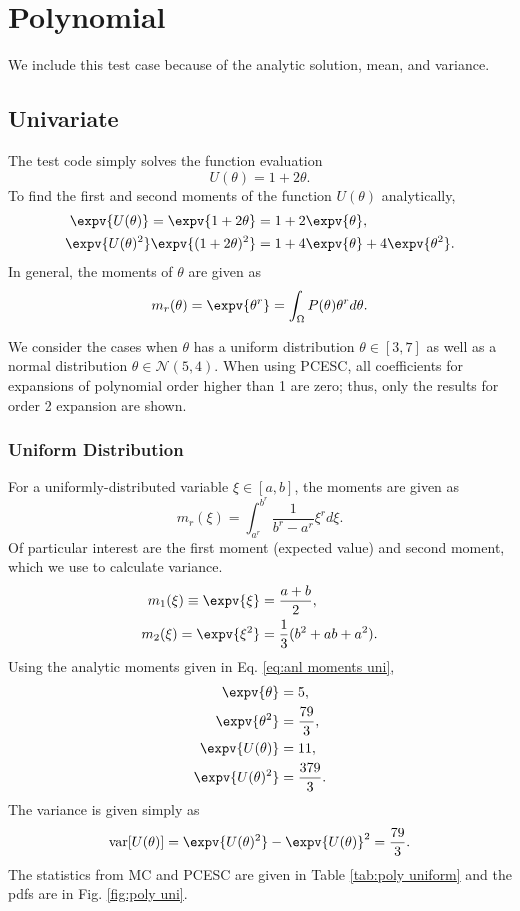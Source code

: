 \section{Polynomial}
We include this test case because of the analytic solution, mean, and variance.  

\subsection{Univariate}
The test code simply solves the function evaluation
\begin{equation}
U(\theta) = 1+2\theta.
\end{equation}
To find the first and second moments of the function $U(\theta)$ analytically,
\begin{align}
\expv{U(\theta)}=\expv{1+2\theta}&=1+2\expv{\theta},\\
\expv{U(\theta)^2}\expv{(1+2\theta)^2}&=1+4\expv{\theta}+4\expv{\theta^2}.
\end{align}
In general, the moments of $\theta$ are given as
\begin{equation}
m_r(\theta)=\expv{\theta^r}=\int_\Omega P(\theta)\theta^r d\theta.
\end{equation}

We consider the cases when $\theta$ has a uniform distribution $\theta\in[3,7]$ as well as a normal distribution $\theta\in\mathcal{N}(5,4)$.  When using PCESC, all coefficients for expansions of polynomial order higher than 1 are zero; thus, only the results for order 2 expansion are shown.

\subsubsection{Uniform Distribution}
For a uniformly-distributed variable $\xi\in[a,b]$, the moments are given as
\begin{equation}
m_r(\xi)=\int_{a^r}^{b^r} \frac{1}{b^r-a^r}\xi^r d\xi.
\end{equation}
Of particular interest are the first moment (expected value) and second moment, which we use to calculate variance.
\begin{align}\label{eq:anl moments uni}
m_1(\xi)\equiv\expv{\xi}&=\frac{a+b}{2},\\
m_2(\xi)=\expv{\xi^2}&=\frac{1}{3}(b^2+ab+a^2).
\end{align}
Using the analytic moments given in Eq. \ref{eq:anl moments uni},
\begin{align}
\expv{\theta} &= 5,\\
\expv{\theta^2}&=\frac{79}{3},\\
\expv{U(\theta)}&=11,\\
\expv{U(\theta)^2}&=\frac{379}{3}.
\end{align}
The variance is given simply as
\begin{equation}
\text{var}[U(\theta)]=\expv{U(\theta)^2}-\expv{U(\theta)}^2=\frac{79}{3}.
\end{equation}
The statistics from MC and PCESC are given in Table \ref{tab:poly uniform} and the pdfs are in Fig. \ref{fig:poly uni}.


